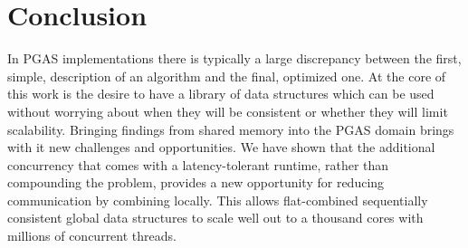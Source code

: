 \section{Conclusion}
In PGAS implementations there is typically a large discrepancy between the first, simple, description of an algorithm and the final, optimized one. At the core of this work is the desire to have a library of data structures which can be used without worrying about when they will be consistent or whether they will limit scalability.
Bringing findings from shared memory into the PGAS domain brings with it new challenges and opportunities.
We have shown that the additional concurrency that comes with a latency-tolerant runtime, rather than compounding the problem, provides a new opportunity for reducing communication by combining locally.
This allows flat-combined sequentially consistent global data structures to scale well out to a thousand cores with millions of concurrent threads.
